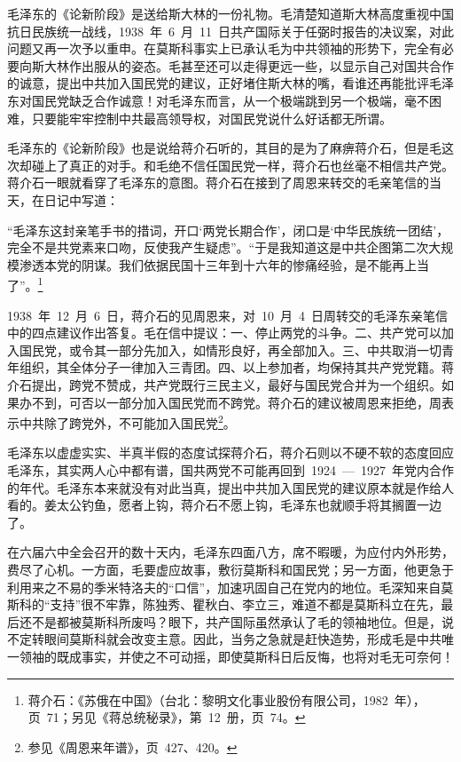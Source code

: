 毛泽东的《论新阶段》是送给斯大林的一份礼物。毛清楚知道斯大林高度重视中国抗日民族统一战线，1938~年~6~月~11~日共产国际关于任弼时报告的决议案，对此问题又再一次予以重申。在莫斯科事实上已承认毛为中共领袖的形势下，完全有必要向斯大林作出服从的姿态。毛甚至还可以走得更远一些，以显示自己对国共合作的诚意，提出中共加入国民党的建议，正好堵住斯大林的嘴，看谁还再能批评毛泽东对国民党缺乏合作诚意！对毛泽东而言，从一个极端跳到另一个极端，毫不困难，只要能牢牢控制中共最高领导权，对国民党说什么好话都无所谓。

毛泽东的《论新阶段》也是说给蒋介石听的，其目的是为了麻痹蒋介石，但是毛这次却碰上了真正的对手。和毛绝不信任国民党一样，蒋介石也丝毫不相信共产党。蒋介石一眼就看穿了毛泽东的意图。蒋介石在接到了周恩来转交的毛亲笔信的当天，在日记中写道：

“毛泽东这封亲笔手书的措词，开口‘两党长期合作’，闭口是‘中华民族统一团结’，完全不是共党素来口吻，反使我产生疑虑”。“于是我知道这是中共企图第二次大规模渗透本党的阴谋。我们依据民国十三年到十六年的惨痛经验，是不能再上当了”。\footnote{蒋介石：《苏俄在中国》（台北：黎明文化事业股份有限公司，1982~年），页~71；另见《蒋总统秘录》，第~12~册，页~74。}

1938~年~12~月~6~日，蒋介石的见周恩来，对~10~月~4~日周转交的毛泽东亲笔信中的四点建议作出答复。毛在信中提议：一、停止两党的斗争。二、共产党可以加入国民党，或令其一部分先加入，如情形良好，再全部加入。三、中共取消一切青年组织，其全体分子一律加入三青团。四、以上参加者，均保持其共产党党籍。蒋介石提出，跨党不赞成，共产党既行三民主义，最好与国民党合并为一个组织。如果办不到，可否以一部分加入国民党而不跨党。蒋介石的建议被周恩来拒绝，周表示中共除了跨党外，不可能加入国民党\footnote{参见《周恩来年谱》，页~427、420。}。

毛泽东以虚虚实实、半真半假的态度试探蒋介石，蒋介石则以不硬不软的态度回应毛泽东，其实两人心中都有谱，国共两党不可能再回到~1924~—~1927~年党内合作的年代。毛泽东本来就没有对此当真，提出中共加入国民党的建议原本就是作给人看的。姜太公钓鱼，愿者上钩，蒋介石不愿上钩，毛泽东也就顺手将其搁置一边了。

在六届六中全会召开的数十天内，毛泽东四面八方，席不暇暖，为应付内外形势，费尽了心机。一方面，毛要虚应故事，敷衍莫斯科和国民党；另一方面，他更急于利用来之不易的季米特洛夫的“口信”，加速巩固自己在党内的地位。毛深知来自莫斯科的“支持”很不牢靠，陈独秀、瞿秋白、李立三，难道不都是莫斯科立在先，最后还不是都被莫斯科所废吗？眼下，共产国际虽然承认了毛的领袖地位。但是，说不定转眼间莫斯科就会改变主意。因此，当务之急就是赶快造势，形成毛是中共唯一领袖的既成事实，并使之不可动摇，即使莫斯科日后反悔，也将对毛无可奈何！

